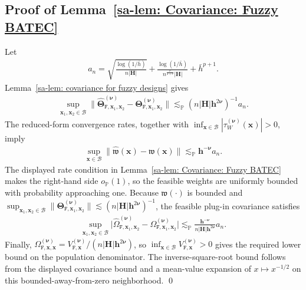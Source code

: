 \documentclass[10pt]{article}
\renewcommand{\P}{\mathbb{P}}
\newcommand{\lessp}{\lesssim_{\mathbb{P}}}
\newcommand{\bh}{\mathbf{h}}
\newcommand{\bH}{\mathbf{H}}
\newcommand{\bx}{\mathbf{x}}
\newcommand{\bnu}{\boldsymbol{\nu}}
\newcommand{\bTheta}{\boldsymbol{\Theta}}
\newcommand{\B}{\mathcal{B}}
\newcommand{\ttF}{\mathtt{F}}
\begin{document}
\subsection{Proof of Lemma~\ref{sa-lem: Covariance: Fuzzy BATEC}}
Let
\begin{align*}
    a_n = \sqrt{\frac{\log(1/\bar{h})}{n |\bH|}}
          + \frac{\log(1/\bar{h})}{n^{\frac{v}{2+v}}|\bH|}
          + \bar{h}^{p+1}.
\end{align*}
Lemma~\ref{sa-lem: covariance for fuzzy designs} gives
\begin{align*}
    \sup_{\bx_1,\bx_2\in\B}
    \big\|\widehat{\bTheta}_{\ttF,\bx_1,\bx_2}^{(\bnu)}
          -\bTheta_{\ttF,\bx_1,\bx_2}^{(\bnu)}\big\|
    \lessp (n|\bH|\bh^{2\bnu})^{-1} a_n .
\end{align*}
The reduced-form convergence rates, together with $\inf_{\bx\in\B}|\tau_W^{(\bnu)}(\bx)|>0$, imply
\begin{align*}
    \sup_{\bx\in\B}\|\widehat{\mathfrak{w}}(\bx)-\mathfrak{w}(\bx)\|
    \lessp \bh^{-\bnu}a_n.
\end{align*}
The displayed rate condition in Lemma~\ref{sa-lem: Covariance: Fuzzy BATEC} makes the right-hand side $o_{\P}(1)$, so the feasible weights are uniformly bounded with probability approaching one.
Because $\mathfrak{w}(\cdot)$ is bounded and
$\sup_{\bx_1,\bx_2\in\B}\|\bTheta_{\ttF,\bx_1,\bx_2}^{(\bnu)}\|
\lesssim (n|\bH|\bh^{2\bnu})^{-1}$, the feasible plug-in covariance satisfies
\begin{align*}
    \sup_{\bx_1,\bx_2 \in \B} \big|\widehat{\Omega}_{\ttF, \bx_1,\bx_2}^{(\bnu)} - \Omega_{\ttF, \bx_1,\bx_2}^{(\bnu)}\big|
    \lessp \frac{\bh^{-\bnu}}{n|\bH|\bh^{2\bnu}}a_n.
\end{align*}
Finally, $\Omega_{\ttF,\bx,\bx}^{(\bnu)}=V_{\mathtt{F},\bx}^{(\bnu)}/(n|\bH|\bh^{2\bnu})$, so $\inf_{\bx\in\B}V_{\mathtt{F},\bx}^{(\bnu)}>0$ gives the required lower bound on the population denominator. The inverse-square-root bound follows from the displayed covariance bound and a mean-value expansion of $x\mapsto x^{-1/2}$ on this bounded-away-from-zero neighborhood. \qed

\end{document}

